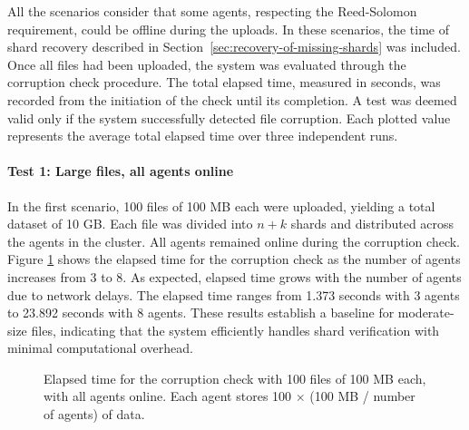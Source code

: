 All the scenarios consider that some agents, respecting the Reed-Solomon
requirement, could be offline during the uploads. In these scenarios, the time of shard recovery described in Section~\ref{sec:recovery-of-missing-shards} was included. Once all files had been uploaded, the system was evaluated through the corruption check procedure. The total elapsed time, measured in seconds, was recorded from the initiation of the check until its completion. A test was deemed valid only if the system successfully detected file corruption. Each plotted value represents the average total elapsed time over three independent runs.

\paragraph{Test 1: Large files, all agents online}

In the first scenario, 100 files of 100 MB each were uploaded, yielding a total
dataset of 10 GB. Each file was divided into $n+k$ shards and distributed across
the agents in the cluster. All agents remained online during the corruption
check. Figure \ref{fig:test-1} shows the elapsed time for the corruption check
as the number of agents increases from 3 to 8. As expected, elapsed time grows
with the number of agents due to network delays. The elapsed time ranges from 1.373 seconds with 3 agents to 23.892 seconds with 8 agents. These results establish a baseline for moderate-size files, indicating that the system efficiently handles shard verification with minimal computational overhead.

\begin{figure}[!ht]
\centering
{}
\caption{Elapsed time for the corruption check with 100 files of 100 MB each,
    with all agents online. Each agent stores 100 $\times$ (100 MB / number of agents) of data.}
\label{fig:test-1}
\end{figure}


